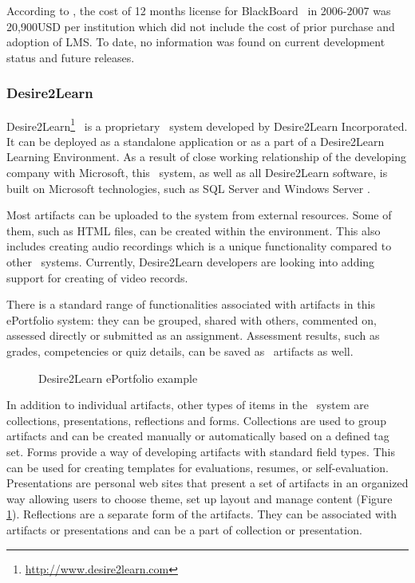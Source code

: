 According to \citet{Sweat-Guy2007}, the cost of 12 months license for
BlackBoard \ep~in 2006-2007 was 20,900USD per institution which did not include
the cost of prior purchase and adoption of LMS. To date, no information was
found on current development status and future releases.

\subsubsection{Desire2Learn}
Desire2Learn\footnote{\url{http://www.desire2learn.com}} \ep~is a proprietary
\ep~system developed by Desire2Learn Incorporated. It can be deployed as a
standalone application or as a part of a Desire2Learn Learning Environment. As a
result of close working relationship of the developing company with Microsoft,
this \ep~system, as well as all Desire2Learn software, is built on Microsoft
technologies, such as SQL Server and Windows Server \citep{AAEEBL2011a}.

Most artifacts can be uploaded to the system from external resources. Some of
them, such as HTML files, can be created within the environment. This also
includes creating audio recordings which is a unique functionality compared to
other \ep~systems. Currently, Desire2Learn developers are looking into adding
support for creating of video records.

There is a standard range of functionalities associated with artifacts in this
ePortfolio system: they can be grouped, shared with others, commented on,
assessed directly or submitted as an assignment. Assessment results, such as
grades, competencies or quiz details, can be saved as \ep~artifacts as well.

\begin{figure}[htb]
\centering
\setlength\fboxsep{0pt}
\setlength\fboxrule{0.5pt}
\fbox{\texttt{[image: CH4-F7-D2L]}}
\caption[Desire2Learn ePortfolio example]{Desire2Learn ePortfolio example
\citep{Desire2LearnIncorporated2011}}
\label{fig:d2ep} 
\end{figure}

In addition to individual artifacts, other types of items in the \ep~system are
collections, presentations, reflections and forms. Collections are used to group
artifacts and can be created manually or automatically based on a defined tag
set. Forms provide a way of developing artifacts with standard field types. This
can be used for creating templates for evaluations, resumes, or self-evaluation.
Presentations are personal web sites that present a set of artifacts in an
organized way allowing users to choose theme, set up layout and manage content
(Figure \ref{fig:d2ep}). Reflections are a separate form of the artifacts. They
can be associated with artifacts or presentations and can be a part of
collection or presentation.

